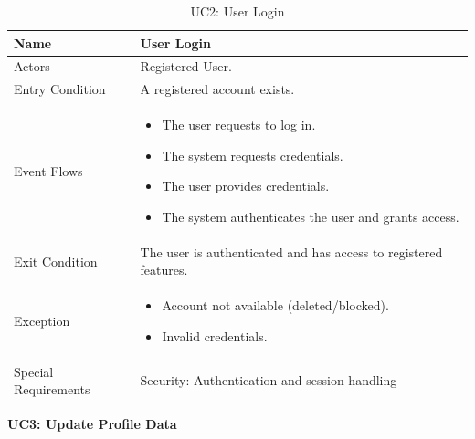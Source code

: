 \begin{table}[H]
    \centering
    \renewcommand{\arraystretch}{1.3}
    \begin{tabular}{|p{}|p{}|}
        \hline
        Name & \textbf{User Login} \\
        \hline
        Actors & Registered User. \\
        \hline
        Entry Condition & A registered account exists. \\
        \hline
        Event Flows & \begin{itemize}[topsep=0pt, partopsep=0pt, leftmargin=*]
            \item The user requests to log in.
            \item The system requests credentials.
            \item The user provides credentials.
            \item The system authenticates the user and grants access.
        \end{itemize} \\
        \hline
        Exit Condition & The user is authenticated and has access to registered features. \\
        \hline
        Exception & \begin{itemize}[topsep=0pt, partopsep=0pt, leftmargin=*]
            \item Account not available (deleted/blocked).
            \item Invalid credentials.
        \end{itemize} \\
        \hline
        Special Requirements & Security: Authentication and session handling \\
        \hline
    \end{tabular}
    \caption{UC2: User Login}
    \label{uc2}
\end{table}

\newpage
\noindent
\textbf{UC3: Update Profile Data}

